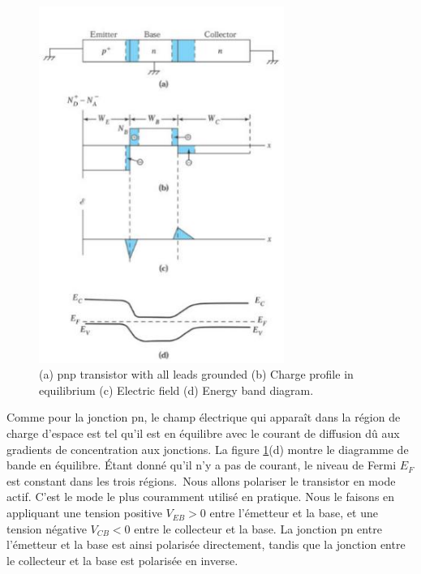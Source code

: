 \begin{figure}[h!]
\centering
\includegraphics[width=8cm]{figures/ch01/bjt2.jpg}
\caption{(a) pnp transistor with all leads grounded (b) Charge profile in equilibrium (c) Electric field (d) Energy band diagram.} 
\label{fig:bjt2}
\end{figure}
Comme pour la jonction pn, le champ électrique qui apparaît dans la région de charge d'espace est tel qu'il est en équilibre avec le courant de diffusion dû aux gradients de concentration aux jonctions. La figure \ref{fig:bjt2}(d) montre le diagramme de bande en équilibre. Étant donné qu'il n'y a pas de courant, le niveau de Fermi $E_F$ est constant dans les trois régions.\
Nous allons polariser le transistor en mode actif. C'est le mode le plus couramment utilisé en pratique. Nous le faisons en appliquant une tension positive $V_{EB} > 0$ entre l'émetteur et la base, et une tension négative $V_{CB} < 0$ entre le collecteur et la base. La jonction pn entre l'émetteur et la base est ainsi polarisée directement, tandis que la jonction entre le collecteur et la base est polarisée en inverse.\

